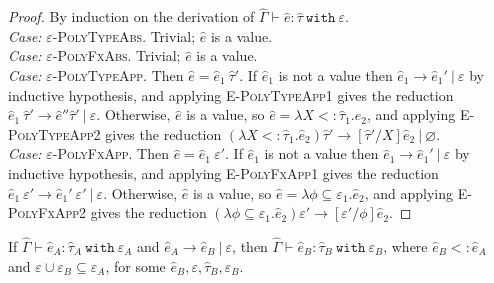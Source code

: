 \documentclass{llncs}
\newcommand{\keywadj}[1]{\mathtt{#1}}
\newcommand{\keyw}[1]{\keywadj{#1}~}
\newcommand{\kw}[1]{\keyw{ #1 }}
\begin{document}
\begin{proof} By induction on the derivation of $\hat \Gamma \vdash \hat e: \hat \tau~\kw{with} \varepsilon$.\\

\textit{Case:} \textsc{$\varepsilon$-PolyTypeAbs}. Trivial; $\hat e$ is a value. \\

\textit{Case:} \textsc{$\varepsilon$-PolyFxAbs}. Trivial; $\hat e$ is a value. \\

\textit{Case:} \textsc{$\varepsilon$-PolyTypeApp}. Then $\hat e= \hat e_1~\hat \tau'$. If $\hat e_1$ is not a value then $\hat e_1 \longrightarrow \hat e_1'~|~\varepsilon$ by inductive hypothesis, and applying \textsc{E-PolyTypeApp1} gives the reduction $\hat e_1~\hat \tau' \longrightarrow \hat e'' \hat \tau'~|~\varepsilon$. Otherwise, $\hat e$ is a value, so $\hat e = \lambda X <: \hat \tau_1. \hat e_2$, and applying \textsc{E-PolyTypeApp2} gives the reduction $(\lambda X <: \hat \tau_1. \hat e_2) \hat \tau' \longrightarrow [\hat \tau'/X]\hat e_2~|~\varnothing$. \\

\textit{Case:} \textsc{$\varepsilon$-PolyFxApp}. Then $\hat e = \hat e_1~\varepsilon'$. If $\hat e_1$ is not a value then $\hat e_1 \longrightarrow \hat e_1'~|~\varepsilon$ by inductive hypothesis, and applying \textsc{E-PolyFxApp1} gives the reduction $\hat e_1~\varepsilon' \longrightarrow \hat e_1'~\varepsilon'~|~\varepsilon$. Otherwise, $\hat e$ is a value, so $\hat e = \lambda \phi \subseteq \varepsilon_1.\hat e_2$, and applying \textsc{E-PolyFxApp2} gives the reduction $(\lambda \phi \subseteq \varepsilon_1.\hat e_2) \varepsilon' \longrightarrow [\varepsilon'/\phi]\hat e_2$.


\end{proof}

\hrulefill

\begin{theorem} [Preservation]
If $\hat \Gamma \vdash \hat e_A: \hat \tau_A~\kw{with} \varepsilon_A$ and $\hat e_A \longrightarrow \hat e_B~|~\varepsilon$, then $\hat \Gamma \vdash \hat e_B: \hat \tau_B~\kw{with} \varepsilon_B$, where $\hat e_B <: \hat e_A$ and $\varepsilon \cup \varepsilon_B \subseteq \varepsilon_A$, for some $\hat e_B, \varepsilon, \hat \tau_B, \varepsilon_B$.
\end{theorem}
\end{document}
